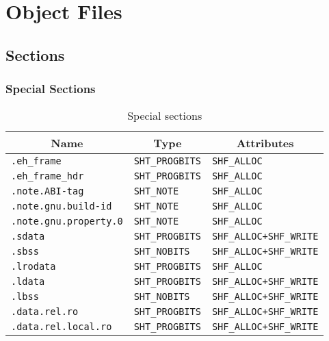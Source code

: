 
\chapter{Object Files}

\section{Sections}

\subsection{Special Sections}

\begin{table}[H]
\Hrule
  \caption{Special sections}
  \begin{center}
    \begin{tabular}[t]{l|l|l}
      \multicolumn{1}{c}{Name} & \multicolumn{1}{c}{Type}
       & \multicolumn{1}{c}{Attributes} \\
      \hline
      \texttt{.eh_frame} & \texttt{SHT_PROGBITS} & \texttt{SHF_ALLOC} \\
      \texttt{.eh_frame_hdr} & \texttt{SHT_PROGBITS} & \texttt{SHF_ALLOC} \\
      \texttt{.note.ABI-tag} & \texttt{SHT_NOTE} & \texttt{SHF_ALLOC} \\
      \texttt{.note.gnu.build-id} & \texttt{SHT_NOTE} & \texttt{SHF_ALLOC} \\
      \texttt{.note.gnu.property.0} & \texttt{SHT_NOTE} & \texttt{SHF_ALLOC} \\
      \texttt{.sdata} & \texttt{SHT_PROGBITS} & \texttt{SHF_ALLOC+SHF_WRITE} \\
      \texttt{.sbss} & \texttt{SHT_NOBITS} & \texttt{SHF_ALLOC+SHF_WRITE} \\
      \texttt{.lrodata} & \texttt{SHT_PROGBITS} & \texttt{SHF_ALLOC} \\
      \texttt{.ldata} & \texttt{SHT_PROGBITS} & \texttt{SHF_ALLOC+SHF_WRITE} \\
      \texttt{.lbss} & \texttt{SHT_NOBITS} & \texttt{SHF_ALLOC+SHF_WRITE} \\
      \texttt{.data.rel.ro} & \texttt{SHT_PROGBITS} & \texttt{SHF_ALLOC+SHF_WRITE} \\
      \texttt{.data.rel.local.ro} & \texttt{SHT_PROGBITS} & \texttt{SHF_ALLOC+SHF_WRITE}
    \end{tabular}
  \end{center}
\Hrule
\end{table}

